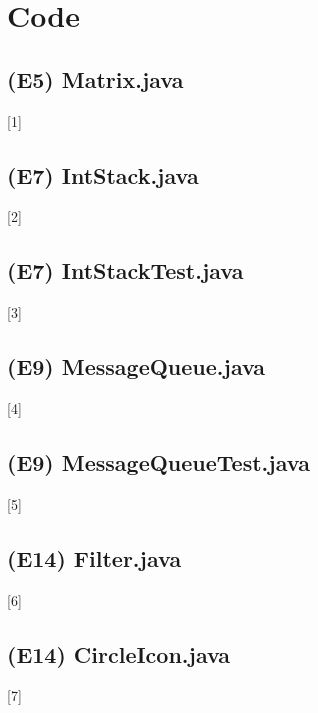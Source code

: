\documentclass[main.tex]{subfiles}
\begin{document}
\section*{Code}

\subsection*{(E5) Matrix.java}
\hypertarget{Matrix}{[1]}


\newpage
\subsection*{(E7) IntStack.java}
\hypertarget{IntStack}{[2]}


\newpage
\subsection*{(E7) IntStackTest.java}
\hypertarget{IntStackTest}{[3]}


\newpage
\subsection*{(E9) MessageQueue.java}
\hypertarget{MessageQueue}{[4]}


\newpage
\subsection*{(E9) MessageQueueTest.java}
\hypertarget{MessageQueueTest}{[5]}


\newpage
\subsection*{(E14) Filter.java}
\hypertarget{Filter}{[6]}


\newpage
\subsection*{(E14) CircleIcon.java}
\hypertarget{CircleIcon}{[7]}

\end{document}
